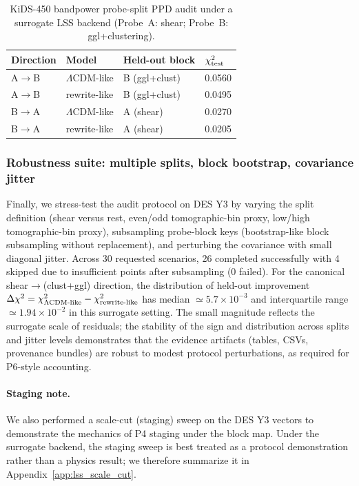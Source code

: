 \documentclass[11pt]{article}
\theoremstyle{definition}
\theoremstyle{plain}
\theoremstyle{remark}
\begin{document}
\begin{table}[t]
\centering
\caption{KiDS-450 bandpower probe-split PPD audit under a surrogate LSS backend (Probe~A: shear; Probe~B: ggl+clustering).}
\label{tab:lss_ppd_kids}
\begin{tabular}{@{}llll@{}}
\toprule
Direction & Model & Held-out block & $\chi^2_{\rm test}$ \\
\midrule
A$\to$B & $\Lambda$CDM-like & B (ggl+clust) & 0.0560 \\
A$\to$B & rewrite-like & B (ggl+clust) & 0.0495 \\
B$\to$A & $\Lambda$CDM-like & A (shear) & 0.0270 \\
B$\to$A & rewrite-like & A (shear) & 0.0205 \\
\bottomrule
\end{tabular}
\end{table}

\subsubsection{Robustness suite: multiple splits, block bootstrap, covariance jitter}\label{sec:results:lss_robustness}
Finally, we stress-test the audit protocol on DES Y3 by varying the split definition (shear versus rest, even/odd tomographic-bin proxy, low/high tomographic-bin proxy), subsampling probe-block keys (bootstrap-like block subsampling without replacement), and perturbing the covariance with small diagonal jitter.
Across 30 requested scenarios, 26 completed successfully with 4 skipped due to insufficient points after subsampling (0 failed).
For the canonical shear$\to$(clust+ggl) direction, the distribution of held-out improvement $\Delta\chi^2=\chi^2_{\Lambda{\rm CDM\text{-}like}}-\chi^2_{\rm rewrite\text{-}like}$ has median $\simeq 5.7\times 10^{-3}$ and interquartile range $\simeq 1.94\times 10^{-2}$ in this surrogate setting.
The small magnitude reflects the surrogate scale of residuals; the stability of the sign and distribution across splits and jitter levels demonstrates that the evidence artifacts (tables, CSVs, provenance bundles) are robust to modest protocol perturbations, as required for P6-style accounting.

\paragraph{Staging note.}
We also performed a scale-cut (staging) sweep on the DES Y3 vectors to demonstrate the mechanics of P4 staging under the block map.
Under the surrogate backend, the staging sweep is best treated as a protocol demonstration rather than a physics result; we therefore summarize it in Appendix~\ref{app:lss_scale_cut}.
\end{document}
